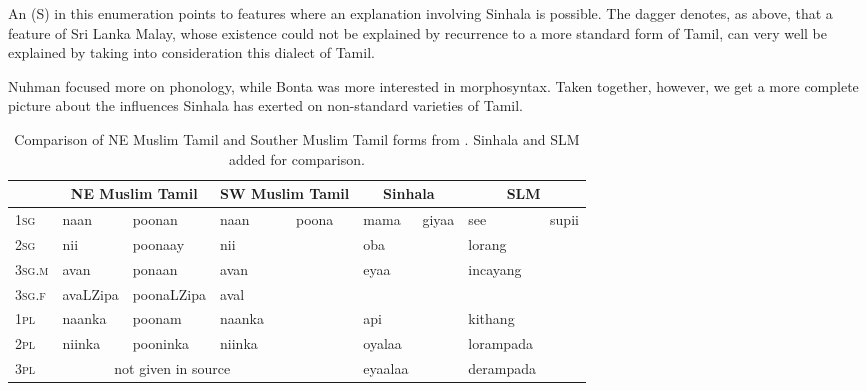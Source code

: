 \documentclass{article}
\renewcommand{\lz}{LZipa}
\renewcommand{\ng}{NGipa}
\begin{document}
An (S) in this enumeration points to features where an explanation involving Sinhala is possible. The dagger denotes, as above, that a feature of Sri Lanka Malay, whose existence could not be explained by recurrence to a more standard form of Tamil, can very well be explained by taking into consideration this dialect of Tamil. 


Nuhman focused more on phonology, while Bonta was more interested in morphosyntax. Taken together, however, we get a more complete picture about the influences Sinhala has exerted on non-standard varieties of Tamil. 


 

\begin{table}
\begin{center}
\begin{tabular}{l|ll|ll|ll|ll}
    & \multicolumn{2}{c}{NE Muslim Tamil} &  \multicolumn{2}{c}{SW Muslim Tamil} &  \multicolumn{2}{c}{Sinhala} & \multicolumn{2}{c}{SLM} \\ \hline
1\textsc{sg}  & naan & poonan     & naan &   \multirow{7}{0.4cm}{poona}  &mama  & \multirow{7}{0.6cm}{giyaa} & see & \multirow{7}{0.4cm}{supii}\\
2\textsc{sg}  & nii  &  poonaay    &  nii  &    & oba &    & lorang  &   \\
3\textsc{sg.m} & avan &  ponaan     & avan  &    & \multirow{2}{1cm}{eyaa}  &   & \multirow{2}{1cm}{incayang} &    \\
3\textsc{sg.f} & ava{\lz} &  poona{\lz}     & aval &     & & \\
1\textsc{pl}  & naanka  & poonam   & naanka  &   & api &    & kithang  &  \\
2\textsc{pl}  & niinka &  pooninka & niinka  &    &oyalaa &    & lorampada &    \\
3\textsc{pl}  & \multicolumn{4}{c|}{not given in source} & eyaalaa & & derampada &   \\
\end{tabular}
\end{center}
\caption{Comparison of NE Muslim Tamil and Souther Muslim Tamil forms from \citet[76]{Nuhman2007}. Sinhala and SLM added for comparison.}
\label{tab:TAMagr}
\end{table}

 

\end{document}

